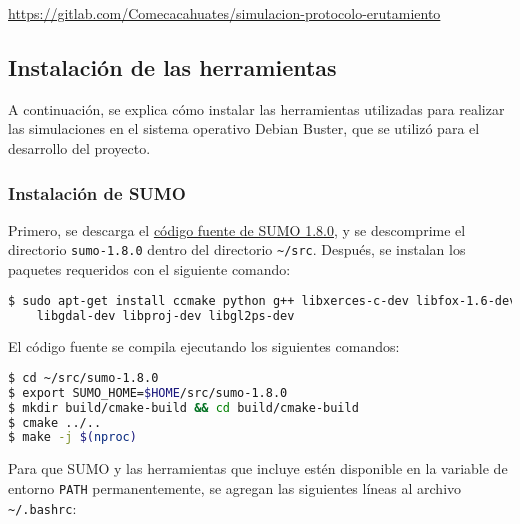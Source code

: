 \begin{center}
\href{https://gitlab.com/Comecacahuates/simulacion-protocolo-erutamiento}
{https://gitlab.com/Comecacahuates/simulacion-protocolo-erutamiento}
\end{center}

\subsection{Instalación de las herramientas}
\label{subsec:instalacion_herramientas}

A continuación, se explica cómo instalar las herramientas utilizadas para
realizar las simulaciones en el sistema operativo Debian Buster, que se utilizó
para el desarrollo del proyecto.

\subsubsection{Instalación de SUMO}
\label{subsubsec:instalacion_sumo}

Primero, se descarga el
\href{https://sourceforge.net/projects/sumo/files/sumo/}{código fuente de SUMO
1.8.0}, y se descomprime el directorio {\lstinline[language=bash]!sumo-1.8.0!}
dentro del directorio {\lstinline[language=bash]!~/src!}. Después, se instalan
los paquetes requeridos con el siguiente comando:

\begin{lstlisting}[language=bash]
$ sudo apt-get install ccmake python g++ libxerces-c-dev libfox-1.6-dev \
    libgdal-dev libproj-dev libgl2ps-dev
\end{lstlisting}

El código fuente se compila ejecutando los siguientes comandos:

\begin{lstlisting}[language=bash]
$ cd ~/src/sumo-1.8.0
$ export SUMO_HOME=$HOME/src/sumo-1.8.0
$ mkdir build/cmake-build && cd build/cmake-build
$ cmake ../..
$ make -j $(nproc)
\end{lstlisting}

Para que SUMO y las herramientas que incluye estén disponible en la variable de
entorno {\lstinline[language=bash]!PATH!} permanentemente, se agregan las
siguientes líneas al archivo {\lstinline[language=bash]!~/.bashrc!}:


